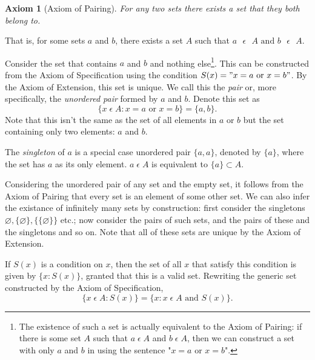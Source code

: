 \documentclass[12pt]{article}
\newtheorem{axiom}{Axiom}
\begin{document}
\begin{axiom}[Axiom of Pairing]
    For any two sets there exists a set that they both belong to.
\end{axiom}
That is, for some sets $a$ and $b$, there exists a set $A$ such that $a \text{ } \epsilon \text{ } A \text{ and } b \text{ }
\epsilon \text{ } A$.

Consider the set that contains $a$ and $b$ and nothing else\footnote{The existence of such a set is actually equivalent to the Axiom of Pairing:
if there is some set $A$ such that $a \; \epsilon \; A$ and $b \; \epsilon \; A$, then we can construct
a set with only $a$ and $b$ in using the sentence "$x = a \text{ or } x = b$".}.
This can be constructed from the Axiom of Specification using the condition $S(x) =
"x = a \text{ or } x = b"$. By the Axiom of Extension, this set is unique. We call this the \textit{pair}
or, more specifically, the \textit{unordered pair} formed by $a$ and $b$. Denote this set as
\begin{equation}
    \{x \; \epsilon \; A: x = a \text{ or } x = b\} = \{a, b\}.
\end{equation}
Note that this isn't the same as the set of all elements in $a$ or $b$ but the set containing only two
elements: $a$ and $b$.

The \textit{singleton} of $a$ is a special case unordered pair $\{a, a\}$, denoted by $\{a\}$, where the set has $a$
as its only element. $a \; \epsilon \; A$ is equivalent to $\{a\} \subset A$.

Considering the unordered pair of any set and the empty set, it follows from the Axiom of Pairing
that every set is an element of some other set. We can also infer the existance of infinitely many sets by construction:
first consider the singletons $\varnothing, \{\varnothing\}, \{\{\varnothing\}\}$ etc.; now consider the pairs of such sets, and the
pairs of these and the singletons and so on. Note that all of these sets are unique by the Axiom of Extension.

If $S(x)$ is a condition on $x$, then the set of all $x$ that satisfy this condition is given by $\{x:S(x)\}$,
granted that this is a valid set. Rewriting the generic set constructed by the Axiom of Specification,
\begin{displaymath}
    \{x\;\epsilon\;A: S(x)\} = \{x: x\;\epsilon\;A \text{ and } S(x)\}.
\end{displaymath}
\end{document}
